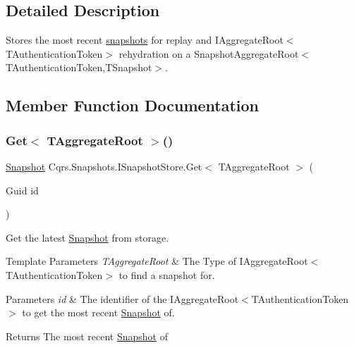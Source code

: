 \subsection{Detailed Description}
Stores the most recent \hyperlink{classCqrs_1_1Snapshots_1_1Snapshot}{snapshots} for replay and I\+Aggregate\+Root$<$\+T\+Authentication\+Token$>$ rehydration on a Snapshot\+Aggregate\+Root$<$\+T\+Authentication\+Token,\+T\+Snapshot$>$. 



\subsection{Member Function Documentation}
\mbox{\label{interfaceCqrs_1_1Snapshots_1_1ISnapshotStore_ab7bd163fc9cd5c3bd5911679030be403_ab7bd163fc9cd5c3bd5911679030be403}} 
\subsubsection{\texorpdfstring{Get$<$ T\+Aggregate\+Root $>$()}{Get< TAggregateRoot >()}}
{\footnotesize\ttfamily \hyperlink{classCqrs_1_1Snapshots_1_1Snapshot}{Snapshot} Cqrs.\+Snapshots.\+I\+Snapshot\+Store.\+Get$<$ T\+Aggregate\+Root $>$ (\begin{DoxyParamCaption}\item[{Guid}]{id }\end{DoxyParamCaption})}



Get the latest \hyperlink{classCqrs_1_1Snapshots_1_1Snapshot}{Snapshot} from storage. 


\begin{DoxyTemplParams}{Template Parameters}
{\em T\+Aggregate\+Root} & The Type of I\+Aggregate\+Root$<$\+T\+Authentication\+Token$>$ to find a snapshot for.\\
\hline
\end{DoxyTemplParams}

\begin{DoxyParams}{Parameters}
{\em id} & The identifier of the I\+Aggregate\+Root$<$\+T\+Authentication\+Token$>$ to get the most recent \hyperlink{classCqrs_1_1Snapshots_1_1Snapshot}{Snapshot} of.\\
\hline
\end{DoxyParams}
\begin{DoxyReturn}{Returns}
The most recent \hyperlink{classCqrs_1_1Snapshots_1_1Snapshot}{Snapshot} of
\end{DoxyReturn}


